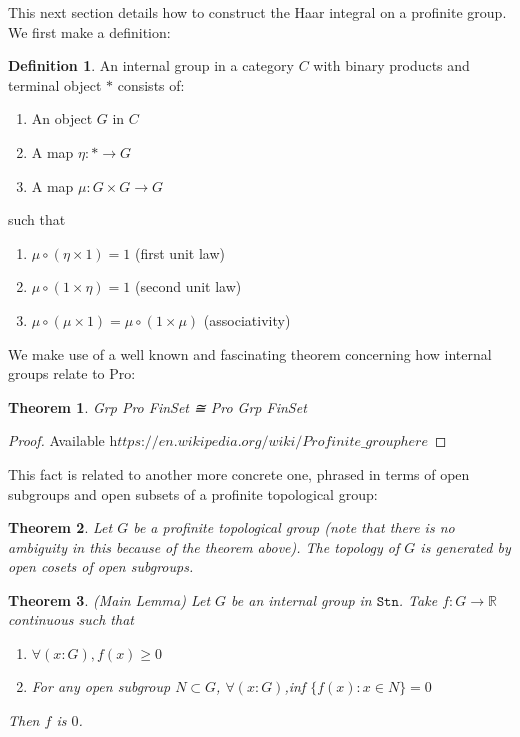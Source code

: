 \documentclass[13pt]{amsart}
\newtheorem{theorem}{Theorem}
\theoremstyle{definition}
\newtheorem{definition}{Definition}
\begin{document}
This next section details how to construct the Haar integral on a profinite group. We first make a definition:

\begin{definition}
An internal group in a category $C$ with binary products and terminal object $*$ consists of:
\begin{enumerate}
\item An object $G$ in $C$
\item A map $η : * \rightarrow G$
\item A map $μ : G × G \rightarrow G$
\end{enumerate} 
such that 
\begin{enumerate}
 \item $μ \circ (\eta \times 1) = 1$ (first unit law)
\item $μ \circ (1 \times \eta) = 1$ (second unit law)
\item $μ \circ (μ \times 1) = μ \circ (1 \times μ)$ (associativity)
\end{enumerate}
\end{definition}

We make use of a well known and fascinating theorem concerning how internal groups relate to Pro:

\begin{theorem}
Grp Pro FinSet ≅ Pro Grp FinSet
\end{theorem}

\begin{proof}
Available $\textit{https://en.wikipedia.org/wiki/Profinite_group}{here}$
\end{proof}

This fact is related to another more concrete one, phrased in terms of open subgroups and open subsets of a profinite topological group:

\begin{theorem}
Let $G$ be a profinite topological group (note that there is no ambiguity in this because of the theorem above). The topology of $G$ is generated by open cosets of open subgroups.
\end{theorem}

\begin{theorem} (Main Lemma)
Let $G$ be an internal group in $\texttt{Stn}$. Take $f : G \rightarrow \mathbb{R}$ continuous such that 
\begin{enumerate}
\item $\forall (x : G),f(x) \geq 0$
\item For any open subgroup $N \subset G$, $\forall (x:G)$,inf $\{ f(x) : x \in N \} = 0$
\end{enumerate}
Then $f$ is $0$.
\end{theorem}
\end{document}
